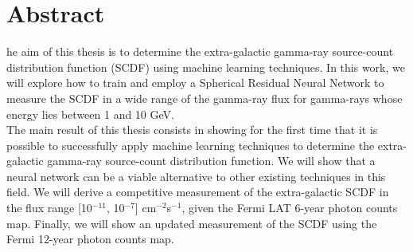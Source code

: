\chapter*{Abstract}

he aim of this thesis is to determine the extra-galactic gamma-ray source-count distribution function (SCDF) using machine learning techniques. In this work, we will explore how to train and employ a Spherical Residual Neural Network to measure the SCDF in a wide range of the gamma-ray flux for gamma-rays whose energy lies between 1 and 10 GeV. 
\\
The main result of this thesis consists in showing for the first time that it is possible to successfully apply machine learning techniques to determine the extra-galactic gamma-ray source-count distribution function. We will show that a neural network can be a viable alternative to other existing techniques in this field. We will derive a competitive measurement of the extra-galactic SCDF in the flux range [10$^{-11}$, 10$^{-7}$] cm$^{-2}$s$^{-1}$, given the Fermi LAT 6-year photon counts map. 
Finally, we will show an updated measurement of the SCDF using the Fermi 12-year photon counts map. 

